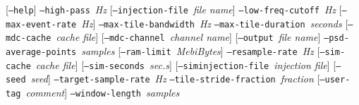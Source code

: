 \documentclass[10pt]{article}
\newcommand{\option}[1]{\texttt{#1}}
\newcommand{\parm}[1]{\textit{#1}}
\newenvironment{entry}%
{\begin{list}{}{\renewcommand{\makelabel}[1]%
{\parbox[b]{\labelwidth}{\makebox[0pt][l]{\textbf{##1}}\\}}%
\setlength{\labelwidth}{1em}%
\setlength{\labelsep}{1em}%
\setlength{\leftmargin}{2em}%
\setlength{\topsep}{\medskipamount}%
\setlength{\itemsep}{\medskipamount}%
\setlength{\parsep}{\medskipamount}%
\setlength{\listparindent}{0pt}}}
{\end{list}}
\begin{document}
\begin{entry}
[\option{--help}] \newline \hspace*{0.5in}
\option{--high-pass}~\parm{Hz} \newline \hspace*{0.5in}
[\option{--injection-file}~\parm{file name}] \newline \hspace*{0.5in}
\option{--low-freq-cutoff}~\parm{Hz} \newline \hspace*{0.5in}
[\option{--max-event-rate}~\parm{Hz}] \newline \hspace*{0.5in}
\option{--max-tile-bandwidth}~\parm{Hz} \newline \hspace*{0.5in}
\option{--max-tile-duration}~\parm{seconds} \newline \hspace*{0.5in}
[\option{--mdc-cache}~\parm{cache file}] \newline \hspace*{0.5in}
[\option{--mdc-channel}~\parm{channel name}] \newline \hspace*{0.5in}
[\option{--output}~\parm{file name}] \newline \hspace*{0.5in}
\option{--psd-average-points}~\parm{samples} \newline \hspace*{0.5in}
[\option{--ram-limit}~\parm{MebiBytes}] \newline \hspace*{0.5in}
\option{--resample-rate}~\parm{Hz} \newline \hspace*{0.5in}
[\option{--sim-cache}~\parm{cache file}] \newline \hspace*{0.5in}
[\option{--sim-seconds}~\parm{sec.s}] \newline \hspace*{0.5in}
[\option{--siminjection-file}~\parm{injection file}] \newline \hspace*{0.5in}
[\option{--seed}~\parm{seed}] \newline \hspace*{0.5in}
\option{--target-sample-rate}~\parm{Hz} \newline \hspace*{0.5in}
\option{--tile-stride-fraction}~\parm{fraction} \newline \hspace*{0.5in}
[\option{--user-tag}~\parm{comment}] \newline \hspace*{0.5in}
\option{--window-length}~\parm{samples} \newline \hspace*{0.5in}


\end{entry}
\end{document}
